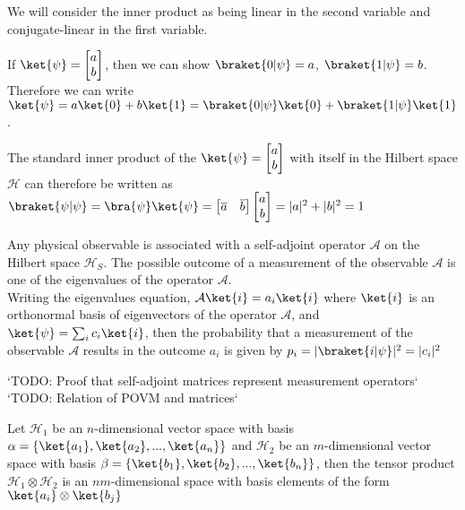 We will consider the inner product as being linear in the second variable and conjugate-linear in the first variable.

\begin{remark}
If $\ket{\psi} = \begin{bmatrix} a \\ b \end{bmatrix}$, then we can show $\braket{0|\psi} = a$, $\braket{1|\psi} = b$.
Therefore we can write $\ket{\psi} = a \ket{0} + b \ket{1} = \braket{0|\psi} \ket{0} + \braket{1|\psi} \ket{1}$.
\end{remark}

\begin{remark}
The standard inner product of the $\ket{\psi} = \begin{bmatrix} a \\ b \end{bmatrix}$ with itself in the Hilbert space $\mathcal{H}$ can therefore be written as $\braket{\psi | \psi} = \bra{\psi}\ket{\psi} = \begin{bmatrix} \overline{a} & \overline{b}\end{bmatrix} \begin{bmatrix} a \\ b \end{bmatrix} = |a|^2 + |b|^2 = 1$
\end{remark}

\begin{lemma}
Any physical observable is associated with a self-adjoint operator $\mathcal{A}$ on the Hilbert space $\mathcal{H}_S$. The possible outcome of a measurement of the observable $\mathcal{A}$ is one of the eigenvalues of the operator $\mathcal{A}$. \\
Writing the eigenvalues equation, $\mathcal{A} \ket{i} = a_i \ket{i}$ where $\ket{i}$ is an orthonormal basis of eigenvectors of the operator $\mathcal{A}$, and  $\ket{\psi} = \sum_i c_i \ket{i}$,  then the probability that a measurement of the observable $\mathcal{A}$ results in the outcome $a_i$ is given by $p_i = |\braket{i|\psi}|^2 = |c_i|^2$
\end{lemma}

`TODO: Proof that self-adjoint matrices represent measurement operators`
`TODO: Relation of POVM and matrices`

Let $\mathcal{H}_1$ be an $n$-dimensional vector space with basis $\alpha = \{ \ket{a_1}, \ket{a_2}, ..., \ket{a_n} \}$ and $\mathcal{H}_2$ be an $m$-dimensional vector space with basis $\beta = \{ \ket{b_1}, \ket{b_2}, ..., \ket{b_n} \}$, then the tensor product $\mathcal{H}_1 \otimes \mathcal{H}_2$ is an $nm$-dimensional space with basis elements of the form $\ket{a_i} \otimes \ket{b_j}$

